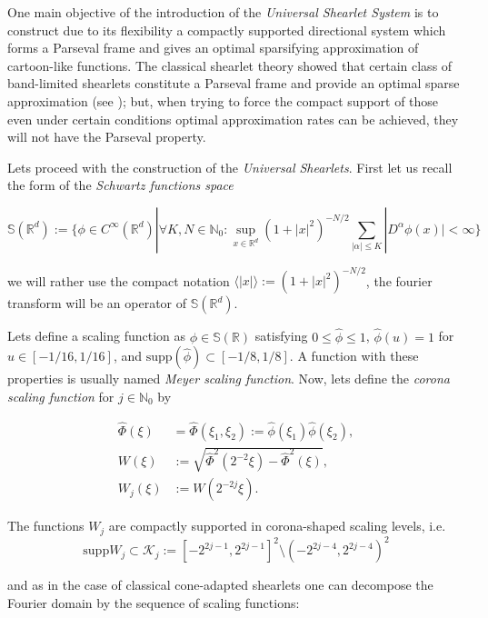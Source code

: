 One main objective of the introduction of the \textit{Universal Shearlet System} is to construct due to its flexibility a compactly supported directional system which forms a Parseval frame and gives an optimal sparsifying approximation of cartoon-like functions. The classical shearlet theory showed that certain class of band-limited shearlets constitute a Parseval frame and provide an optimal sparse approximation (see \cite{Guo-Labate}); but, when trying to force the compact support of those even under certain conditions optimal approximation rates can be achieved, they will not have the Parseval property. 

\bigskip 

Lets proceed with the construction of the \textit{Universal Shearlets}. First let us recall the form of the \textit{Schwartz functions space} 

$$
\mathbb{S}(\mathbb{R}^d):=\{\phi\in C^{\infty}(\mathbb{R}^d)|\forall K,N\in\mathbb{N}_0:\sup_{x\in\mathbb{R}^d}(1+|x|^2)^{-N/2}\sum_{|\alpha|\leq K}|D^{\alpha}\phi(x)|<\infty\}
$$

we will rather use the compact notation $\langle|x|\rangle:=(1+|x|^2)^{-N/2}$, the fourier transform will be an operator of $\mathbb{S}(\mathbb{R}^d)$. 

\bigskip

Lets define a scaling function as  $\phi\in\mathbb{S}(\mathbb{R})$ satisfying $0\leq \hat{\phi}\leq 1$, $\hat{\phi}(u)=1$ for $u\in [-1/16,1/16]$, and $\text{supp}(\hat{\phi})\subset [-1/8,1/8]$. A function with these properties is usually named \textit{Meyer scaling function}. Now, lets define the \textit{corona scaling function} for $j\in\mathbb{N}_0$ by

$$
\begin{aligned}
\hat{\Phi}(\xi)&=\hat{\Phi}(\xi_1,\xi_2):=\hat{\phi}(\xi_1)\hat{\phi}(\xi_2),\\
W(\xi)&:= \sqrt{\hat{\Phi}^2(2^{-2}\xi)-\hat{\Phi}^2(\xi)},\\
W_j(\xi)&:=W(2^{-2j}\xi).
\end{aligned}
$$

The functions $W_j$ are compactly supported in corona-shaped scaling levels, i.e.\,
\begin{equation}
\label{eq:alpha31}
\text{supp}W_j\subset \mathcal{K}_j:=[-2^{2j-1},2^{2j-1}]^2\setminus (-2^{2j-4},2^{2j-4})^2
\end{equation}

and as in the case of classical cone-adapted shearlets one can decompose the Fourier domain by the sequence of scaling functions:


